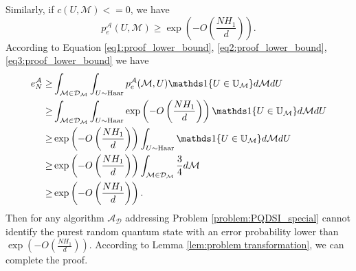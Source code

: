    Similarly, if $c(U,\mathcal{M}) <=0$, we have
    \begin{equation}
    \label{eq3:proof_lower_bound}
        p_e^\mathcal{A}(U,\mathcal{M}) \geq \exp\left(- O\left(\frac{NH_1}{d}\right)\right).
    \end{equation}
    According to Equation \eqref{eq1:proof_lower_bound}, \eqref{eq2:proof_lower_bound}, \eqref{eq3:proof_lower_bound} we have
    \begin{equation*}
        \begin{aligned}
            e^\mathcal{A}_N \geq & \int_{\mathcal{M} \in \mathcal{D}_{\mathcal{M}}} \int_{U \sim \Haar} p^\mathcal{A}_e(\mathcal{M},U)\indicator\{U \in \mathbb{U}_\mathcal{M}\} d\mathcal{M} dU \\
            \geq & \int_{\mathcal{M} \in \mathcal{D}_{\mathcal{M}}} \int_{U \sim \Haar} \exp\left(-O\left( \frac{NH_1}{d}\right)\right) \indicator\{U \in \mathbb{U}_\mathcal{M}\} d\mathcal{M} dU \\
            \geq & \exp\left(-O\left( \frac{NH_1}{d}\right)\right) \int_{U \sim \Haar}  \indicator\{U \in \mathbb{U}_\mathcal{M}\} d\mathcal{M} dU \\
            \geq & \exp\left(-O\left( \frac{NH_1}{d}\right)\right)\int_{\mathcal{M} \in \mathcal{D}_{\mathcal{M}}}  \frac{3}{4} d\mathcal{M} \\
            \geq & \exp\left(- O\left(\frac{NH_1}{d}\right)\right).\\            
        \end{aligned}
    \end{equation*}
    Then for any algorithm $\mathcal{A}_{\mathcal{D}}$ addressing Problem \ref{problem:PQDSI_special} cannot identify the purest random quantum state with an error probability lower than $\exp\left(-O\left( \frac{NH_1}{d}\right)\right)$. According to Lemma \ref{lem:problem transformation}, we can complete the proof.